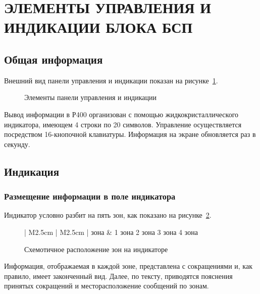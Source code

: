 \section{ЭЛЕМЕНТЫ УПРАВЛЕНИЯ И ИНДИКАЦИИ БЛОКА БСП} \label{sec:overview}


\subsection{Общая информация} 

Внешний вид панели управления и индикации показан на рисунке~\ref{fig:pi}.

\begin{figure}[H]
	
	\caption{Элементы панели управления и индикации}
	\label{fig:pi}
\end{figure}

Вывод информации в Р400 организован с помощью жидкокристаллического индикатора, имеющем 4 строки по 20 символов. Управление осуществляется посредством 16-кнопочной клавиатуры. Информация на экране обновляется раз в секунду.


\subsection{Индикация} 


\subsubsection{Размещение информации в поле индикатора}

Индикатор условно разбит на пять зон, как показано на рисунке~\ref{fig:overview_ind}.

\begin{figure}[H]
	\centering
	
	\begin{tabular}{| M{2.5cm} | M{2.5cm} |}	
		 зона	& 1 зона 				\tabularnewline \hline 
	     {2 зона}	\tabularnewline \hline
	     {3 зона}	\tabularnewline \hline
	     {4 зона}	\tabularnewline 
	    \lasthline 
	\end{tabular} 
	
	\caption{Схемотичное расположение зон на индикаторе} 
	\label{fig:overview_ind}
\end{figure}

Информация, отображаемая в каждой зоне, представлена с сокращениями и, как правило, имеет законченный вид. Далее, по тексту, приводятся пояснения принятых сокращений и месторасположение сообщений по зонам.

